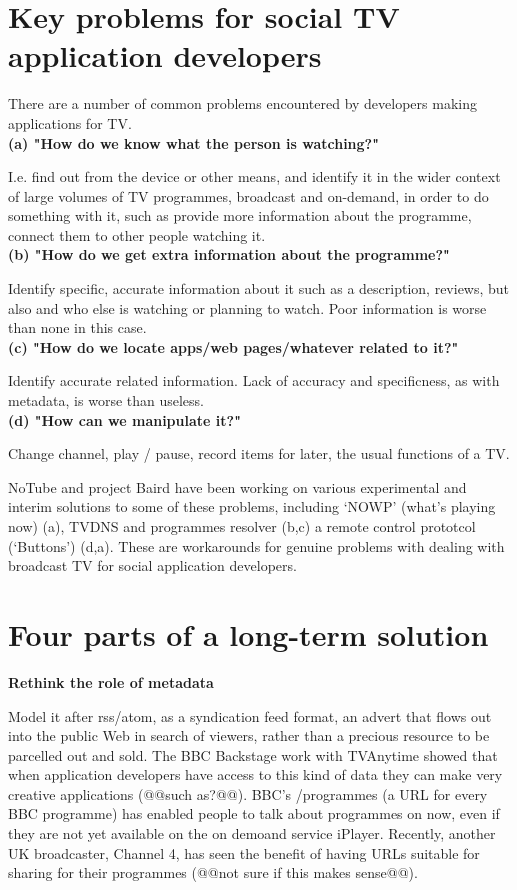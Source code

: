 \documentclass[]{article}%
\begin{document}
\section{Key problems for social TV application developers}

There are a number of common problems encountered by developers making applications for TV.
\\

{\bf{(a) "How do we know what the person is watching?" }}

I.e. find out from the device or other means, and identify it in the wider context of large volumes of TV programmes, broadcast and on-demand, in order to do something with it, such as provide more information about the programme, connect them to other people watching it.
\\

{\bf{(b) "How do we get extra information about the programme?" }}

Identify specific, accurate information about it such as a description, reviews,  but also and who else is watching or planning to watch. Poor information is worse than none in this case.
\\

{\bf{(c) "How do we locate apps/web pages/whatever related to it?" }}

Identify accurate related information. Lack of accuracy and specificness, as with metadata, is worse than useless.
\\

{\bf{(d) "How can we manipulate it?"}}

Change channel, play / pause, record items for later, the usual functions of a TV.

NoTube and project Baird have been working on various experimental and interim solutions to some of these problems, including  `NOWP' (what's playing now) (a),  TVDNS and programmes resolver (b,c)  a remote control prototcol (`Buttons') (d,a). These are workarounds for genuine problems with dealing with broadcast TV for social application developers. 

\section{Four parts of a long-term solution}

{\bf{Rethink the role of metadata}}

Model it after rss/atom, as a syndication feed format, an advert that flows out into the public Web in search of viewers, rather than a precious resource to be parcelled out and sold. The BBC Backstage work with TVAnytime showed that when application developers have access to this kind of data they can make very creative applications (@@such as?@@). BBC's /programmes (a URL for every BBC programme) has enabled people to talk about programmes on now, even if they are not yet available on the on demoand service iPlayer. Recently, another UK broadcaster, Channel 4, has seen the benefit of having URLs suitable for sharing  for their programmes (@@not sure if this makes sense@@).
\\
\end{document}
